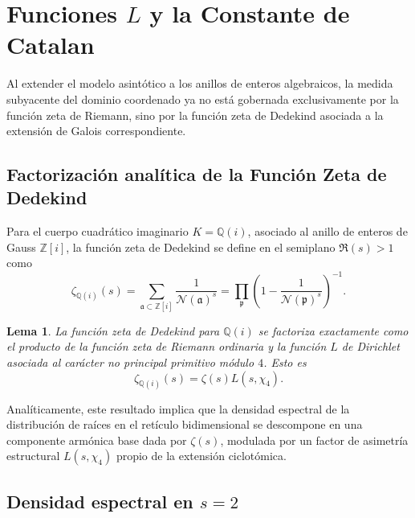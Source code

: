 \documentclass{article}
\numberwithin{equation}{section}
\theoremstyle{plain}
\newtheorem{lema}[teorema]{Lema}
\theoremstyle{definition}
\begin{document}
\section{Funciones \texorpdfstring{$L$}{L} y la Constante de Catalan}
\label{sec:funciones_L}

Al extender el modelo asintótico a los anillos de enteros algebraicos, la medida subyacente del dominio coordenado ya no está gobernada exclusivamente por la función zeta de Riemann, sino por la función zeta de Dedekind asociada a la extensión de Galois correspondiente.

\subsection{Factorización analítica de la Función Zeta de Dedekind}

Para el cuerpo cuadrático imaginario $K = \mathbb{Q}(i)$, asociado al anillo de enteros de Gauss $\mathbb{Z}[i]$, la función zeta de Dedekind se define en el semiplano $\Re(s) > 1$ como
\begin{equation}
    \zeta_{\mathbb{Q}(i)}(s) = \sum_{\mathfrak{a} \subset \mathbb{Z}[i]} \frac{1}{\mathcal{N}(\mathfrak{a})^s} = \prod_{\mathfrak{p}} \left( 1 - \frac{1}{\mathcal{N}(\mathfrak{p})^s} \right)^{-1}.
\end{equation}

\begin{lema}
La función zeta de Dedekind para $\mathbb{Q}(i)$ se factoriza exactamente como el producto de la función zeta de Riemann ordinaria y la función $L$ de Dirichlet asociada al carácter no principal primitivo módulo $4$. Esto es
\begin{equation}
    \zeta_{\mathbb{Q}(i)}(s) = \zeta(s) L(s, \chi_4).
\end{equation}
\end{lema}

Analíticamente, este resultado implica que la densidad espectral de la distribución de raíces en el retículo bidimensional se descompone en una componente armónica base dada por $\zeta(s)$, modulada por un factor de asimetría estructural $L(s, \chi_4)$ propio de la extensión ciclotómica.

\subsection{Densidad espectral en \texorpdfstring{$s=2$}{s=2}}
\end{document}
